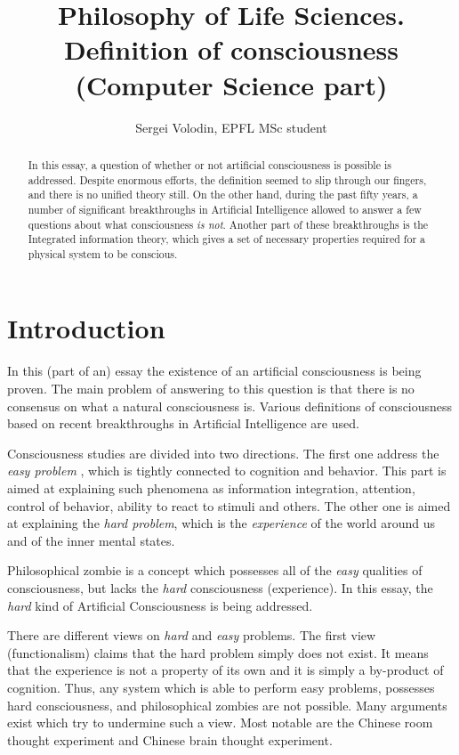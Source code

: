 \documentclass[a4paper, 12pt]{article}
\title{Philosophy of Life Sciences.\\ Definition of consciousness (Computer Science part)}
\author{Sergei Volodin, EPFL MSc student}
\date{}
\begin{document}
\maketitle

\begin{abstract}
In this essay, a question of whether or not artificial consciousness is possible is addressed.
Despite enormous efforts, the definition seemed to slip through our fingers, and there is no unified theory still.
On the other hand, during the past fifty years, a number of significant breakthroughs in Artificial Intelligence allowed to answer a few questions about what consciousness {\em is not}.
Another part of these breakthroughs is the Integrated information theory, which gives a set of necessary properties required for a physical system to be conscious.
\end{abstract}


\section{Introduction}
In this (part of an) essay the existence of an artificial consciousness is being proven. The main problem of answering to this question is that there is no consensus on what a natural consciousness is. Various definitions of consciousness based on recent breakthroughs in Artificial Intelligence are used.

Consciousness studies are divided into two directions. The first one address the {\em easy problem} \cite{chalmers}, which is tightly connected to cognition and behavior. This part is aimed at explaining such phenomena as information integration, attention, control of behavior, ability to react to stimuli and others. The other one is aimed at explaining the {\em hard problem}, which is the {\em experience} of the world around us and of the inner mental states.

Philosophical zombie is a concept which possesses all of the {\em easy} qualities of consciousness, but lacks the {\em hard} consciousness (experience). In this essay, the {\em hard} kind of Artificial Consciousness is being addressed.

There are different views on {\em hard} and {\em easy} problems. The first view (functionalism) claims that the hard problem simply does not exist. It means that the experience is not a property of its own and it is simply a by-product of cognition. Thus, any system which is able to perform easy problems, possesses hard consciousness, and philosophical zombies are not possible. Many arguments exist which try to undermine such a view. Most notable are the Chinese room thought experiment and Chinese brain thought experiment.
\end{document}
